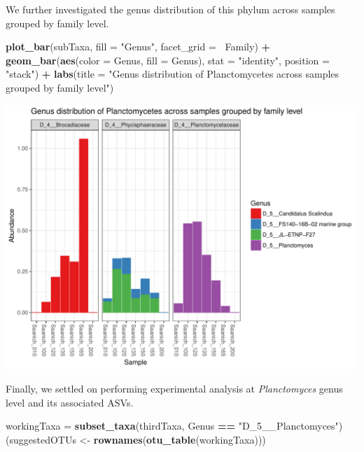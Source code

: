 \documentclass[11 pt,]{article}
\newenvironment{Shaded}{\begin{snugshade}}{\end{snugshade}}
\newcommand{\KeywordTok}[1]{\textcolor[rgb]{0.13,0.29,0.53}{\textbf{#1}}}
\newcommand{\DataTypeTok}[1]{\textcolor[rgb]{0.13,0.29,0.53}{#1}}
\newcommand{\StringTok}[1]{\textcolor[rgb]{0.31,0.60,0.02}{#1}}
\newcommand{\OperatorTok}[1]{\textcolor[rgb]{0.81,0.36,0.00}{\textbf{#1}}}
\newcommand{\NormalTok}[1]{#1}
\begin{document}
We further investigated the genus distribution of this phylum across
samples grouped by family level.

\begin{Shaded}
\begin{Highlighting}[]
\KeywordTok{plot_bar}\NormalTok{(subTaxa, }\DataTypeTok{fill =} \StringTok{"Genus"}\NormalTok{, }\DataTypeTok{facet_grid =} \OperatorTok{~}\NormalTok{Family) }\OperatorTok{+}\StringTok{ }\KeywordTok{geom_bar}\NormalTok{(}\KeywordTok{aes}\NormalTok{(}\DataTypeTok{color =}\NormalTok{ Genus, }
    \DataTypeTok{fill =}\NormalTok{ Genus), }\DataTypeTok{stat =} \StringTok{"identity"}\NormalTok{, }\DataTypeTok{position =} \StringTok{"stack"}\NormalTok{) }\OperatorTok{+}\StringTok{ }\KeywordTok{labs}\NormalTok{(}\DataTypeTok{title =} \StringTok{"Genus distribution of Planctomycetes across samples grouped by family level"}\NormalTok{)}
\end{Highlighting}
\end{Shaded}

\includegraphics{Figs/unnamed-chunk-10-1.pdf}

Finally, we settled on performing experimental analysis at
\emph{Planctomyces} genus level and its associated ASVs.

\begin{Shaded}
\begin{Highlighting}[]
\NormalTok{workingTaxa =}\StringTok{ }\KeywordTok{subset_taxa}\NormalTok{(thirdTaxa, Genus }\OperatorTok{==}\StringTok{ "D_5__Planctomyces"}\NormalTok{)}
\NormalTok{(suggestedOTUs <-}\StringTok{ }\KeywordTok{rownames}\NormalTok{(}\KeywordTok{otu_table}\NormalTok{(workingTaxa)))}
\end{Highlighting}
\end{Shaded}
\end{document}
